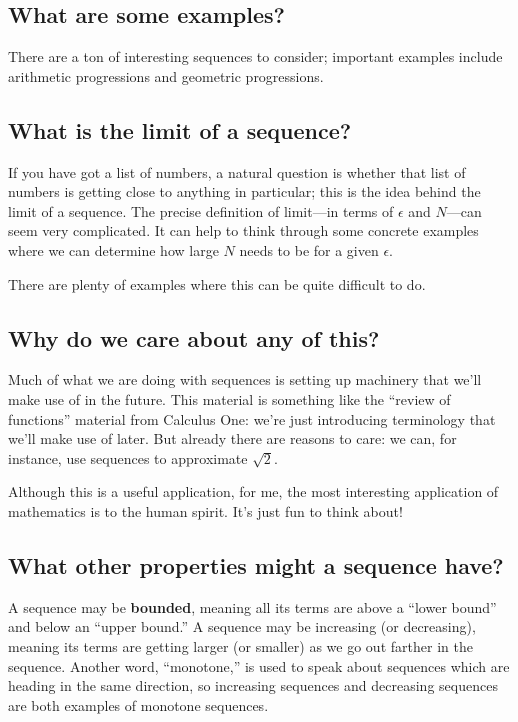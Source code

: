 \documentclass{ximera}
\begin{document}
\subsection{What are some examples?}

There are a ton of interesting sequences to consider; important examples include arithmetic progressions and geometric progressions.

\subsection{What is the limit of a sequence?}

If you have got a list of numbers, a natural question is whether that list of numbers is getting close to anything in particular; this is the idea behind the limit of a sequence.  The precise definition of limit---in terms of \(\epsilon\) and \(N\)---can seem very complicated.  It can help to think through some concrete examples where we can determine how large \(N\) needs to be for a given \(\epsilon\).

There are plenty of examples where this can be quite difficult to do.


\subsection{Why do we care about any of this?}

Much of what we are doing with sequences is setting up machinery that we'll make use of in the future.  This material is something like the ``review of functions'' material from Calculus One: we're just introducing terminology that we'll make use of later.  But already there are reasons to care: we can, for instance, use sequences to approximate \(\sqrt{2}\).


Although this is a useful application, for me, the most interesting application of mathematics is to the human spirit.  It's just fun to think about!

\subsection{What other properties might a sequence have?}

A sequence may be \textbf{bounded}, meaning all its terms are above a ``lower bound'' and below an
``upper bound.''  A sequence may be increasing (or decreasing), meaning its terms are getting larger (or smaller) as we go out farther in the sequence.  
Another word, ``monotone,'' is used to speak about sequences which are heading in the same direction, so increasing sequences and decreasing sequences are both examples of monotone sequences.
\end{document}
